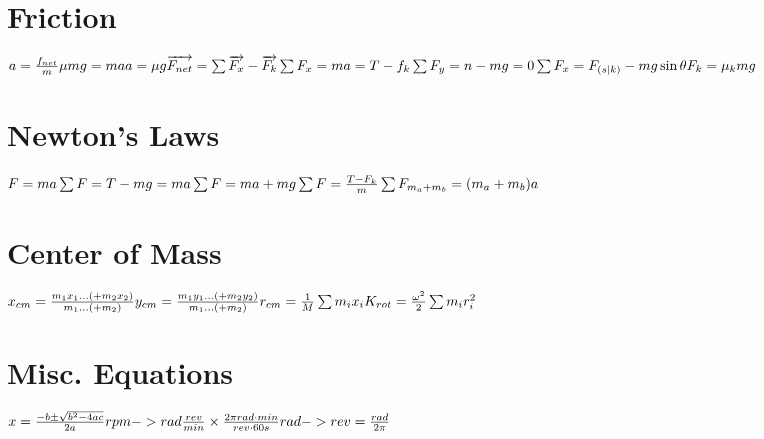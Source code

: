\documentclass[11pt]{article}
\begin{document}
\begin{paracol}{3}
        \section*{Friction}
        \begin{fleqn}
            $
            a=\frac{f_{net}}{m} \newline
            \mu mg = ma \newline
            a= \mu g \newline
            \overrightarrow{F_{net}} = \sum \overrightarrow{F_x}-\overrightarrow{F_{k}} \newline
            \sum F_x = ma = T-f_k \newline
            \sum F_y = n-mg = 0 \newline
            \sum F_x = F_{(s|k)} - mg\sin\theta \newline
            F_k = \mu_{k}mg \newline
            $
        \end{fleqn}
        \switchcolumn
        \section*{Newton's Laws}
        \begin{fleqn}
            $
            F=ma \newline
            \sum F = T - mg = ma \newline
            \sum F = ma + mg \newline
            \sum F = \frac{T-F_k}{m} \newline
            \sum F_{m_a+m_b} = (m_a+m_b)a \newline
            $
        \end{fleqn}
        \section*{Center of Mass}
        \begin{fleqn}
            $
            x_{cm} = \frac{m_1x_1...(+m_2x_2)}{m_1...(+m_2)} \newline
            y_{cm} = \frac{m_1y_1...(+m_2y_2)}{m_1...(+m_2)} \newline
            r_{cm} = \frac1M \sum m_{i}x_i \newline
            K_{rot} = \frac{\omega^2}{2}\sum m_i r_i^2
            $
        \end{fleqn}
        \section*{Misc. Equations}
        \begin{fleqn}
            $
            x = \frac{-b \pm \sqrt{b^2-4ac}}{2a} \newline
            rpm -> rad \frac{rev}{min}\times \frac{2\pi rad \cdot min}{rev \cdot 60s} \newline
            rad -> rev = \frac{rad}{2\pi}
            $
        \end{fleqn}
    \end{paracol}
\end{document}
